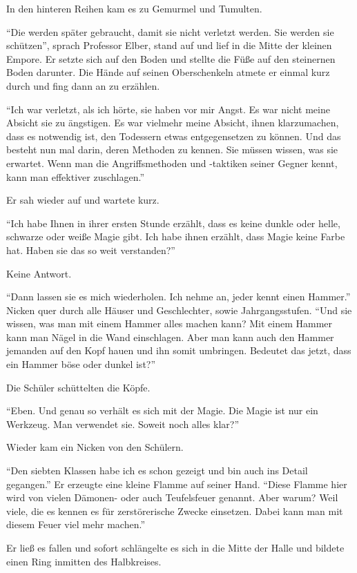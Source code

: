 In den hinteren Reihen kam es zu Gemurmel und Tumulten.

\enquote{Die werden später gebraucht, damit sie nicht verletzt werden. Sie werden sie schützen}, sprach Professor Elber, stand auf und lief in die Mitte der kleinen Empore. Er setzte sich auf den Boden und stellte die Füße auf den steinernen Boden darunter. Die Hände auf seinen Oberschenkeln atmete er einmal kurz durch und fing dann an zu erzählen.

\enquote{Ich war verletzt, als ich hörte, sie haben vor mir Angst. Es war nicht meine Absicht sie zu ängstigen. Es war vielmehr meine Absicht, ihnen klarzumachen, dass es notwendig ist, den Todessern etwas entgegensetzen zu können. Und das besteht nun mal darin, deren Methoden zu kennen. Sie müssen wissen, was sie erwartet. Wenn man die Angriffsmethoden und -taktiken seiner Gegner kennt, kann man effektiver zuschlagen.}

Er sah wieder auf und wartete kurz.

\enquote{Ich habe Ihnen in ihrer ersten Stunde erzählt, dass es keine dunkle oder helle, schwarze oder weiße Magie gibt. Ich habe ihnen erzählt, dass Magie keine Farbe hat. Haben sie das so weit verstanden?}

Keine Antwort.

\enquote{Dann lassen sie es mich wiederholen. Ich nehme an, jeder kennt einen Hammer.} Nicken quer durch alle Häuser und Geschlechter, sowie Jahrgangsstufen. \enquote{Und sie wissen, was man mit einem Hammer alles machen kann? Mit einem Hammer kann man Nägel in die Wand einschlagen. Aber man kann auch den Hammer jemanden auf den Kopf hauen und ihn somit umbringen. Bedeutet das jetzt, dass ein Hammer böse oder dunkel ist?}

Die Schüler schüttelten die Köpfe.

\enquote{Eben. Und genau so verhält es sich mit der Magie. Die Magie ist nur ein Werkzeug. Man verwendet sie. Soweit noch alles klar?}

Wieder kam ein Nicken von den Schülern.

\enquote{Den siebten Klassen habe ich es schon gezeigt und bin auch ins Detail gegangen.} Er erzeugte eine kleine Flamme auf seiner Hand. \enquote{Diese Flamme hier wird von vielen Dämonen- oder auch Teufelsfeuer genannt. Aber warum? Weil viele, die es kennen es für zerstörerische Zwecke einsetzen. Dabei kann man mit diesem Feuer viel mehr machen.}

Er ließ es fallen und sofort schlängelte es sich in die Mitte der Halle und bildete einen Ring inmitten des Halbkreises.

